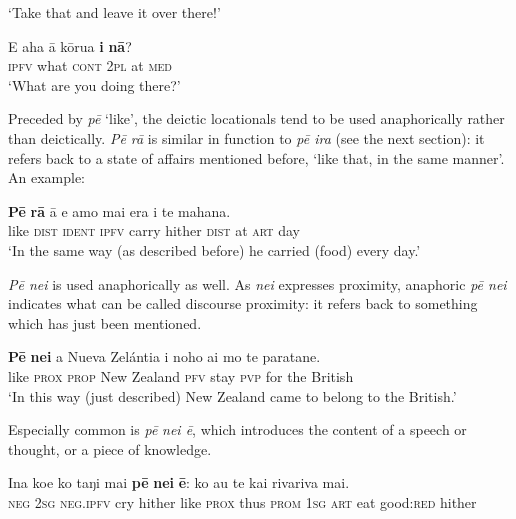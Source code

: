 \glt 
‘Take that and leave it over there!’ \textstyleExampleref{[R208.173]} 
\z

\ea\label{ex:4.228}
\gll E aha {\ꞌ}ā kōrua \textbf{{\ꞌ}i} \textbf{nā}?\\
\textsc{ipfv} what \textsc{cont} \textsc{2pl} at \textsc{med}\\

\glt 
‘What are you doing there?’ \textstyleExampleref{[R416.514]} 
\z

Preceded by \textit{pē} ‘like’, the deictic locationals tend to be used anaphorically rather than deictically. \textit{Pē rā} is similar in function to \textit{pē ira} (see the next section): it refers back to a state of affairs mentioned before, ‘like that, in the same manner’. An example:

\ea\label{ex:4.229}
\gll \textbf{Pē} \textbf{rā} {\ꞌ}ā e {\ꞌ}amo mai era {\ꞌ}i te mahana.\\
like \textsc{dist} \textsc{ident} \textsc{ipfv} carry hither \textsc{dist} at \textsc{art} day\\

\glt
‘In the same way (as described before) he carried (food) every day.’ \textstyleExampleref{[R372.139]} 
\z

\textit{Pē nei} is used anaphorically as well. As \textit{nei} expresses proximity, anaphoric \textit{pē nei} indicates what can be called discourse proximity: it refers back to something which has just been mentioned.

\ea\label{ex:4.230}
\gll \textbf{Pē} \textbf{nei} a Nueva Zelántia i noho ai mo te paratane. \\
like \textsc{prox} \textsc{prop} New Zealand \textsc{pfv} stay \textsc{pvp} for the British \\

\glt
‘In this way (just described) New Zealand came to belong to the British.’ \textstyleExampleref{[R346.022]} 
\z

Especially common is \textit{pē} \textit{nei ē}, which introduces the content of a speech or thought, or a piece of knowledge. 

\ea\label{ex:4.231}
\gll {\ꞌ}Ina koe ko taŋi mai \textbf{pē} \textbf{nei} \textbf{ē}: ko au te kai rivariva mai. \\
\textsc{neg} \textsc{2sg} \textsc{neg.ipfv} cry hither like \textsc{prox} thus \textsc{prom} \textsc{1sg} \textsc{art} eat good:\textsc{red} hither \\

